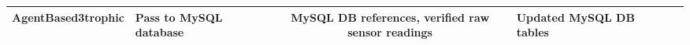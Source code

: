 \documentclass[10pt,legalpaper]{article}
\begin{document}
\begin{sidewaystable}
\begin{tabular}{|l|L|I|S|I|I|I|I|}
		AgentBased3trophic & Pass to MySQL database & & MySQL DB references, verified raw sensor readings & Updated MySQL DB tables \\
		\hline
	\end{tabular}
\end{sidewaystable}
\end{document}
